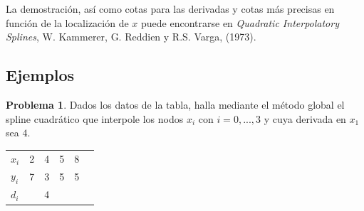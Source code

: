 \documentclass[11pt,spanish,]{article}
\theoremstyle{definition} \newtheorem*{definicion}{Definición}
\newtheorem*{problema}{Problema} \theoremstyle{remark}
\begin{document}
La demostración, así como cotas para las derivadas y cotas más precisas
en función de la localización de $x$ puede encontrarse en
\emph{Quadratic Interpolatory Splines}, W. Kammerer, G. Reddien y R.S.
Varga, (1973).

\subsection{Ejemplos}\label{ejemplos}

\begin{problema}
Dados los datos de la tabla, halla mediante el método global el spline
cuadrático que interpole los nodos $x_i$ con $i=0,...,3$ y cuya derivada en $x_1$ sea $4$.
\begin{table}[h]
\centering
\begin{tabular}{@{}l|lllll@{}}
$x_i$ & 2 & 4 & 5 & 8 \\
$y_i$ & 7 & 3 & 5 & 5 \\
$d_i$ &   & 4 &   &   \\
\end{tabular}
\end{table}
\end{problema}
\end{document}
